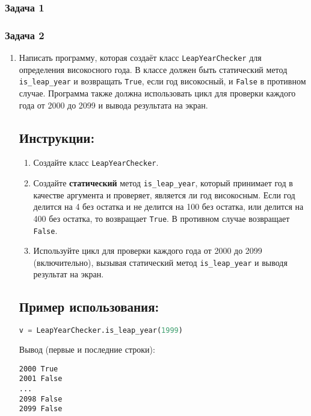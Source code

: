 \subsubsection{Задача 1}



\subsubsection{Задача 2}

\begin{enumerate}
    \item

Написать программу, которая создаёт класс \texttt{LeapYearChecker} 
для определения високосного года. В классе должен быть статический метод
\texttt{is\_leap\_year} и возвращать \texttt{True}, если год високосный, 
и \texttt{False} в противном случае. 
Программа также должна использовать цикл для проверки каждого года от 
2000 до 2099 и вывода результата на экран.

\subsection*{Инструкции:}
\begin{enumerate}
    \item Создайте класс \texttt{LeapYearChecker}.
    \item Создайте \textbf{статический} метод \texttt{is\_leap\_year}, который принимает год в качестве аргумента и проверяет, является ли год високосным. Если год делится на 4 без остатка и не делится на 100 без остатка, или делится на 400 без остатка, то возвращает \texttt{True}. В противном случае возвращает \texttt{False}.
    \item Используйте цикл для проверки каждого года от 2000 до 2099 (включительно), вызывая статический метод \texttt{is\_leap\_year} и выводя результат на экран.
\end{enumerate}

\subsection*{Пример использования:}
\begin{lstlisting}[language=Python]
    v = LeapYearChecker.is_leap_year(1999)
\end{lstlisting}
Вывод (первые и последние строки):
\begin{verbatim}
2000 True
2001 False
...
2098 False
2099 False
\end{verbatim}


\end{enumerate}
